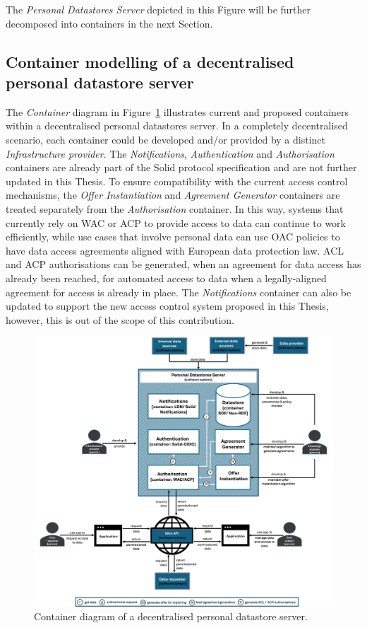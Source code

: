 The \textit{Personal Datastores Server} depicted in this Figure will be further decomposed into containers in the next Section.

\subsection{Container modelling of a decentralised personal datastore server}
\label{sec:c4_container}

The \textit{Container} diagram in Figure~\ref{fig:c4-container} illustrates current and proposed containers within a decentralised personal datastores server.
In a completely decentralised scenario, each container could be developed and/or provided by a distinct \textit{Infrastructure provider}.
The \textit{Notifications}, \textit{Authentication} and \textit{Authorisation} containers are already part of the Solid protocol specification \citep{capadisli_solid_2022} and are not further updated in this Thesis.
To ensure compatibility with the current access control mechanisms, the \textit{Offer Instantiation} and \textit{Agreement Generator} containers are treated separately from the \textit{Authorisation} container.
In this way, systems that currently rely on WAC or ACP to provide access to data can continue to work efficiently, while use cases that involve personal data can use OAC policies to have data access agreements aligned with European data protection law.
ACL and ACP authorisations can be generated, when an agreement for data access has already been reached, for automated access to data when a legally-aligned agreement for access is already in place.
The \textit{Notifications} container can also be updated to support the new access control system proposed in this Thesis, however, this is out of the scope of this contribution.

\begin{figure}[ht]
    \centering
    \includegraphics[width=1\linewidth]{figures//chapter-6/container.png}
    \caption{Container diagram of a decentralised personal datastore server.}
    \label{fig:c4-container}
\end{figure}

